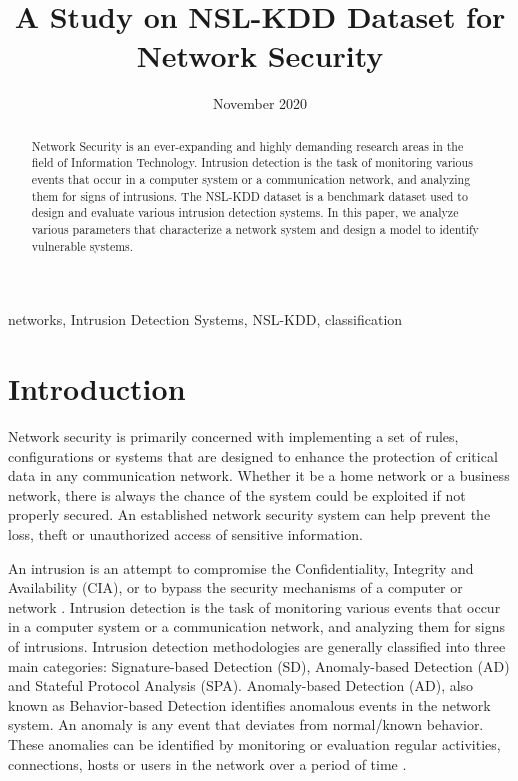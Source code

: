 \documentclass[conference]{IEEEtran}
\title{A Study on NSL-KDD Dataset for Network Security}
\author{\IEEEauthorblockN{Rojina Deuja}
\IEEEauthorblockA{\textit{Department of Computer Science and Engineering} \\
\textit{University of Nebraska-Lincoln}\\
Lincoln, United States \\
rojinadeuja33g@gmail.com}}
\date{November 2020}
\begin{document}
\maketitle

\begin{abstract}
Network Security is an ever-expanding and highly demanding research areas in the field of Information Technology. Intrusion detection is the task of monitoring various events that occur in a computer system or a communication network, and analyzing them for signs of intrusions. The NSL-KDD dataset is a benchmark dataset used to design and evaluate various intrusion detection systems. In this paper, we analyze various parameters that characterize a network system and design a model to identify vulnerable systems.
\end{abstract}

\begin{IEEEkeywords}
networks, Intrusion Detection Systems, NSL-KDD, classification
\end{IEEEkeywords}

\section{Introduction}
Network security is primarily concerned with implementing a set of rules, configurations or systems that are designed to enhance the protection of critical data in any communication network. Whether it be a home network or a business network, there is always the chance of the system could be exploited if not properly secured. An established network security system can help prevent the loss, theft or unauthorized access of sensitive information.

An intrusion is an attempt to compromise the Confidentiality, Integrity and Availability (CIA), or to bypass the security mechanisms of a computer or network \cite{b1}. Intrusion detection is the task of monitoring various events that occur in a computer system or a communication network, and analyzing them for signs of intrusions. Intrusion detection methodologies are generally classified into three main categories: Signature-based Detection (SD), Anomaly-based Detection (AD) and Stateful Protocol Analysis (SPA). Anomaly-based Detection (AD), also known as Behavior-based Detection identifies anomalous events in the network system. An anomaly is any event that deviates from normal/known behavior. These anomalies can be identified by monitoring or evaluation regular activities, connections, hosts or users in the network over a period of time \cite{b2}.
\end{document}
